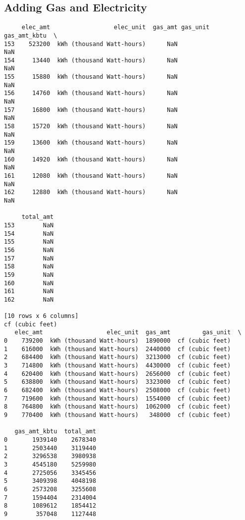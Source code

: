 \documentclass[12pt]{article}
\begin{document}
\subsection{Adding Gas and Electricity}
\begin{verbatim}
     elec_amt                  elec_unit  gas_amt gas_unit  gas_amt_kbtu  \
153    523200  kWh (thousand Watt-hours)      NaN                    NaN   
154     13440  kWh (thousand Watt-hours)      NaN                    NaN   
155     15880  kWh (thousand Watt-hours)      NaN                    NaN   
156     14760  kWh (thousand Watt-hours)      NaN                    NaN   
157     16800  kWh (thousand Watt-hours)      NaN                    NaN   
158     15720  kWh (thousand Watt-hours)      NaN                    NaN   
159     13600  kWh (thousand Watt-hours)      NaN                    NaN   
160     14920  kWh (thousand Watt-hours)      NaN                    NaN   
161     12080  kWh (thousand Watt-hours)      NaN                    NaN   
162     12880  kWh (thousand Watt-hours)      NaN                    NaN   

     total_amt  
153        NaN  
154        NaN  
155        NaN  
156        NaN  
157        NaN  
158        NaN  
159        NaN  
160        NaN  
161        NaN  
162        NaN  

[10 rows x 6 columns]
cf (cubic feet)
   elec_amt                  elec_unit  gas_amt         gas_unit  \
0    739200  kWh (thousand Watt-hours)  1890000  cf (cubic feet)   
1    616000  kWh (thousand Watt-hours)  2440000  cf (cubic feet)   
2    684400  kWh (thousand Watt-hours)  3213000  cf (cubic feet)   
3    714800  kWh (thousand Watt-hours)  4430000  cf (cubic feet)   
4    620400  kWh (thousand Watt-hours)  2656000  cf (cubic feet)   
5    638800  kWh (thousand Watt-hours)  3323000  cf (cubic feet)   
6    682400  kWh (thousand Watt-hours)  2508000  cf (cubic feet)   
7    719600  kWh (thousand Watt-hours)  1554000  cf (cubic feet)   
8    764800  kWh (thousand Watt-hours)  1062000  cf (cubic feet)   
9    770400  kWh (thousand Watt-hours)   348000  cf (cubic feet)   

   gas_amt_kbtu  total_amt  
0       1939140    2678340  
1       2503440    3119440  
2       3296538    3980938  
3       4545180    5259980  
4       2725056    3345456  
5       3409398    4048198  
6       2573208    3255608  
7       1594404    2314004  
8       1089612    1854412  
9        357048    1127448  


\end{verbatim}
\end{document}
